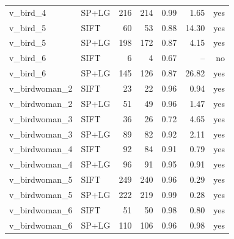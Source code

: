 \begin{longtable}{llrrrrr}
v\_bird\_4 & SP+LG & 216 & 214 & 0.99 & 1.65 & yes \\
v\_bird\_5 & SIFT & 60 & 53 & 0.88 & 14.30 & yes \\
v\_bird\_5 & SP+LG & 198 & 172 & 0.87 & 4.15 & yes \\
v\_bird\_6 & SIFT & 6 & 4 & 0.67 & -- & no \\
v\_bird\_6 & SP+LG & 145 & 126 & 0.87 & 26.82 & yes \\
v\_birdwoman\_2 & SIFT & 23 & 22 & 0.96 & 0.94 & yes \\
v\_birdwoman\_2 & SP+LG & 51 & 49 & 0.96 & 1.47 & yes \\
v\_birdwoman\_3 & SIFT & 36 & 26 & 0.72 & 4.65 & yes \\
v\_birdwoman\_3 & SP+LG & 89 & 82 & 0.92 & 2.11 & yes \\
v\_birdwoman\_4 & SIFT & 92 & 84 & 0.91 & 0.79 & yes \\
v\_birdwoman\_4 & SP+LG & 96 & 91 & 0.95 & 0.91 & yes \\
v\_birdwoman\_5 & SIFT & 249 & 240 & 0.96 & 0.29 & yes \\
v\_birdwoman\_5 & SP+LG & 222 & 219 & 0.99 & 0.28 & yes \\
v\_birdwoman\_6 & SIFT & 51 & 50 & 0.98 & 0.80 & yes \\
v\_birdwoman\_6 & SP+LG & 110 & 106 & 0.96 & 0.98 & yes \\
\end{longtable}\endgroup
